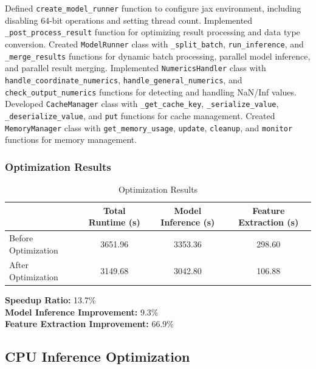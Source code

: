 \documentclass[a4paper,12pt]{article}
\begin{document}
Defined \texttt{create\_model\_runner} function to configure jax environment, including disabling 64-bit operations and setting thread count. Implemented \texttt{\_post\_process\_result} function for optimizing result processing and data type conversion. Created \texttt{ModelRunner} class with \texttt{\_split\_batch}, \texttt{run\_inference}, and \texttt{\_merge\_results} functions for dynamic batch processing, parallel model inference, and parallel result merging. Implemented \texttt{NumericsHandler} class with \texttt{handle\_coordinate\_numerics}, \texttt{handle\_general\_numerics}, and \texttt{check\_output\_numerics} functions for detecting and handling NaN/Inf values. Developed \texttt{CacheManager} class with \texttt{\_get\_cache\_key}, \texttt{\_serialize\_value}, \texttt{\_deserialize\_value}, and \texttt{put} functions for cache management. Created \texttt{MemoryManager} class with \texttt{get\_memory\_usage}, \texttt{update}, \texttt{cleanup}, and \texttt{monitor} functions for memory management.



\subsubsection{Optimization Results}

\begin{table}[H]
\centering
\caption{Optimization Results}
\vspace{0.5cm}
\begin{tabular}{lccc}
\toprule
 & Total Runtime (s) & Model Inference (s) & Feature Extraction (s) \\
\midrule
Before Optimization & 3651.96 & 3353.36 & 298.60 \\
After Optimization & 3149.68 & 3042.80 & 106.88 \\
\bottomrule
\end{tabular}
\end{table}

\textbf{Speedup Ratio:} 13.7\% \\
\textbf{Model Inference Improvement:} 9.3\% \\
\textbf{Feature Extraction Improvement:} 66.9\%

\subsection{CPU Inference Optimization}
\end{document}
